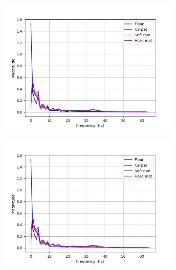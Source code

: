 \documentclass[USenglish]{ifimaster}  %
\begin{document}
\begin{figure}[h]
\begin{subfigure}{0.5\linewidth}
\centering
\includegraphics[scale=0.4]{Figures/fftx}
\caption{}
\label{fig:sub1}
\end{subfigure}%
\begin{subfigure}{.5\linewidth}
\centering
\includegraphics[scale=0.4]{Figures/fftx}
\caption{}
\label{fig:sub2}
\end{subfigure}\\[1ex]
\begin{subfigure}{\linewidth}
\centering

\end{subfigure}
\end{figure}
\end{document}
